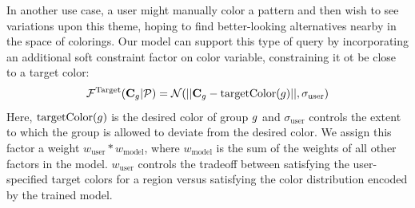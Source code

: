 In another use case, a user might manually color a pattern and then wish to see variations upon this theme, hoping to find better-looking alternatives nearby in the space of colorings. Our model can support this type of query by incorporating an additional soft constraint factor on color variable, constraining it ot be close to a target color:
\begin{equation}
\mathcal{F}^\textrm{Target}(\mathbf{C}_g | \mathcal{P}) = \mathcal{N}(||\mathbf{C}_g - \textrm{targetColor}(g)||, \sigma_\textrm{user})
\label{eq:targetFactor}
\end{equation}
Here, $\textrm{targetColor}(g)$ is the desired color of group $g$ and $\sigma_\textrm{user}$ controls the extent to which the group is allowed to deviate from the desired color. We assign this factor a weight $w_\textrm{user} * w_\textrm{model}$, where $w_\textrm{model}$ is the sum of the weights of all other factors in the model. $w_\textrm{user}$ controls the tradeoff between satisfying the user-specified target colors for a region versus satisfying the color distribution encoded by the trained model.
%


